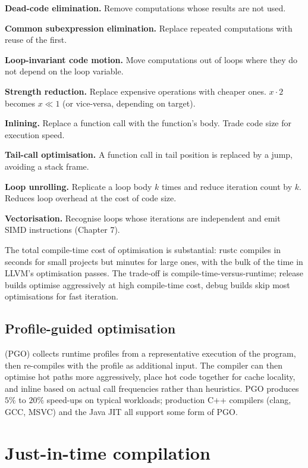\textbf{Dead-code elimination.} Remove computations whose results are not used.

\textbf{Common subexpression elimination.} Replace repeated computations with reuse of the first.

\textbf{Loop-invariant code motion.} Move computations out of loops where they do not depend on the loop variable.

\textbf{Strength reduction.} Replace expensive operations with cheaper ones. $x \cdot 2$ becomes $x \ll 1$ (or vice-versa, depending on target).

\textbf{Inlining.} Replace a function call with the function's body. Trade code size for execution speed.

\textbf{Tail-call optimisation.} A function call in tail position is replaced by a jump, avoiding a stack frame.

\textbf{Loop unrolling.} Replicate a loop body $k$ times and reduce iteration count by $k$. Reduces loop overhead at the cost of code size.

\textbf{Vectorisation.} Recognise loops whose iterations are independent and emit SIMD instructions (Chapter 7).

The total compile-time cost of optimisation is substantial: rustc compiles in seconds for small projects but minutes for large ones, with the bulk of the time in LLVM's optimisation passes. The trade-off is compile-time-versus-runtime; release builds optimise aggressively at high compile-time cost, debug builds skip most optimisations for fast iteration.

\subsection{Profile-guided optimisation}

 (PGO) collects runtime profiles from a representative execution of the program, then re-compiles with the profile as additional input. The compiler can then optimise hot paths more aggressively, place hot code together for cache locality, and inline based on actual call frequencies rather than heuristics. PGO produces $5\%$ to $20\%$ speed-ups on typical workloads; production C++ compilers (clang, GCC, MSVC) and the Java JIT all support some form of PGO.

\section{Just-in-time compilation}

